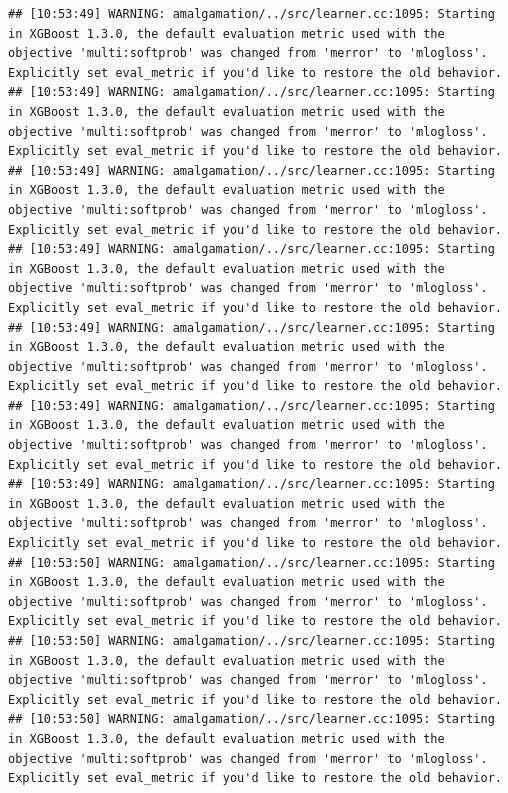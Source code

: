 \documentclass[
]{scrbook}
\begin{document}
\begin{verbatim}
## [10:53:49] WARNING: amalgamation/../src/learner.cc:1095: Starting in XGBoost 1.3.0, the default evaluation metric used with the objective 'multi:softprob' was changed from 'merror' to 'mlogloss'. Explicitly set eval_metric if you'd like to restore the old behavior.
## [10:53:49] WARNING: amalgamation/../src/learner.cc:1095: Starting in XGBoost 1.3.0, the default evaluation metric used with the objective 'multi:softprob' was changed from 'merror' to 'mlogloss'. Explicitly set eval_metric if you'd like to restore the old behavior.
## [10:53:49] WARNING: amalgamation/../src/learner.cc:1095: Starting in XGBoost 1.3.0, the default evaluation metric used with the objective 'multi:softprob' was changed from 'merror' to 'mlogloss'. Explicitly set eval_metric if you'd like to restore the old behavior.
## [10:53:49] WARNING: amalgamation/../src/learner.cc:1095: Starting in XGBoost 1.3.0, the default evaluation metric used with the objective 'multi:softprob' was changed from 'merror' to 'mlogloss'. Explicitly set eval_metric if you'd like to restore the old behavior.
## [10:53:49] WARNING: amalgamation/../src/learner.cc:1095: Starting in XGBoost 1.3.0, the default evaluation metric used with the objective 'multi:softprob' was changed from 'merror' to 'mlogloss'. Explicitly set eval_metric if you'd like to restore the old behavior.
## [10:53:49] WARNING: amalgamation/../src/learner.cc:1095: Starting in XGBoost 1.3.0, the default evaluation metric used with the objective 'multi:softprob' was changed from 'merror' to 'mlogloss'. Explicitly set eval_metric if you'd like to restore the old behavior.
## [10:53:49] WARNING: amalgamation/../src/learner.cc:1095: Starting in XGBoost 1.3.0, the default evaluation metric used with the objective 'multi:softprob' was changed from 'merror' to 'mlogloss'. Explicitly set eval_metric if you'd like to restore the old behavior.
## [10:53:50] WARNING: amalgamation/../src/learner.cc:1095: Starting in XGBoost 1.3.0, the default evaluation metric used with the objective 'multi:softprob' was changed from 'merror' to 'mlogloss'. Explicitly set eval_metric if you'd like to restore the old behavior.
## [10:53:50] WARNING: amalgamation/../src/learner.cc:1095: Starting in XGBoost 1.3.0, the default evaluation metric used with the objective 'multi:softprob' was changed from 'merror' to 'mlogloss'. Explicitly set eval_metric if you'd like to restore the old behavior.
## [10:53:50] WARNING: amalgamation/../src/learner.cc:1095: Starting in XGBoost 1.3.0, the default evaluation metric used with the objective 'multi:softprob' was changed from 'merror' to 'mlogloss'. Explicitly set eval_metric if you'd like to restore the old behavior.

\end{verbatim}
\end{document}
